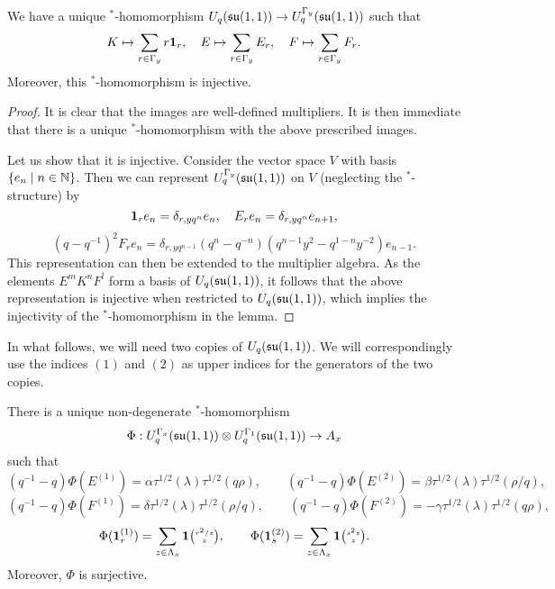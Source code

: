 \begin{Lem} We have a unique $^*$-homomorphism $U_q(\mathfrak{su}(1,1))\rightarrow U_q^{\Gamma_y}(\mathfrak{su}(1,1))$ such that \[K \mapsto \sum_{r\in \Gamma_y} r\mathbf{1}_r,\quad E\mapsto \sum_{r\in \Gamma_y} E_{r},\quad F\mapsto \sum_{r\in \Gamma_y} F_r. \] Moreover, this $^*$-homomorphism is injective.
\end{Lem} 
\begin{proof} It is clear that the images are well-defined multipliers. It is then immediate that there is a unique $^*$-homomorphism with the above prescribed images.

Let us show that it is injective. Consider the vector space $V$ with basis $\{e_n\mid n\in \mathbb{N}\}$. Then we can represent $U_q^{\Gamma_y}(\mathfrak{su}(1,1))$ on $V$ (neglecting the $^*$-structure) by \[\mathbf{1}_r e_n = \delta_{r,yq^n}e_n,\quad E_{r} e_n = \delta_{r,yq^n} e_{n+1},\]\[(q-q^{-1})^2 F_{r}e_n = \delta_{r,yq^{n-1}} (q^n-q^{-n})(q^{n-1}y^2-q^{1-n}y^{-2})e_{n-1}.\] This representation can then be extended to the multiplier algebra. As the elements $E^mK^nF^l$ form a basis of $U_q(\mathfrak{su}(1,1))$, it follows that the above representation is injective when restricted to $U_q(\mathfrak{su}(1,1))$, which implies the injectivity of the $^*$-homomorphism in the lemma. 
\end{proof}  

In what follows, we will need two copies of $U_q(\mathfrak{su}(1,1))$. We will correspondingly use the indices $(1)$  and $(2)$ as upper indices for the generators of the two copies.
\begin{Lem} 

There is a unique non-degenerate $^*$-homomorphism \[\Phi: U_q^{\Gamma_x}(\mathfrak{su}(1,1))\otimes U_q^{\Gamma_1}(\mathfrak{su}(1,1))\rightarrow A_x\] such that 
\[(q^{-1}-q)\Phi(E^{(1)})=  \alpha \tau^{1/2}(\lambda)\tau^{1/2}(q\rho),\qquad (q^{-1}-q)\Phi( E^{(2)}) =  \beta \tau^{1/2}(\lambda)\tau^{1/2}(\rho/q),\]
\[(q^{-1}-q)\Phi(F^{(1)})=  \delta\tau^{1/2}(\lambda)\tau^{1/2}(\rho/q),\qquad (q^{-1}-q)\Phi( F^{(2)}) =  - \gamma\tau^{1/2}(\lambda)\tau^{1/2}(q\rho),\]
\[\Phi(\mathbf{1}_r^{(1)}) = \sum_{z\in \Lambda_x} \mathbf{1}{\tiny {\begin{pmatrix} r^2/z\\z\end{pmatrix}}},\qquad \Phi(\mathbf{1}_s^{(2)}) = \sum_{z\in \Lambda_x} \mathbf{1}{\tiny {\begin{pmatrix} s^2z\\z\end{pmatrix}}}.\] Moreover, $\Phi$ is surjective.
\end{Lem} 

